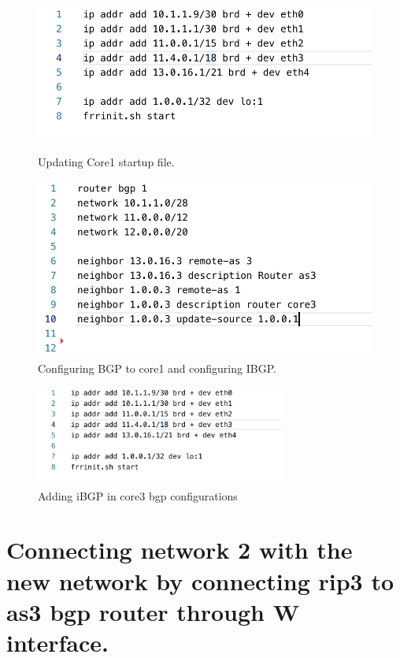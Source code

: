 \begin{figure}[H]
  \centering
  \begin{minipage}[b]{0.45\textwidth}
    \includegraphics[width=\textwidth]{Images/core1Update.png}
    \caption{Updating Core1 startup file.}
  \end{minipage}
  \hfill
  \begin{minipage}[b]{0.45\textwidth}
    \includegraphics[width=\textwidth]{Images/as3Core1.png}
    \caption{Configuring BGP to core1 and configuring IBGP.}
  \end{minipage}
\end{figure}

\begin{figure}[H]
\centering
  \includegraphics[width=0.73\textwidth]{Images/core1Update.png}
  \caption{Adding iBGP in core3 bgp configurations}
  \label{fig:2.10}
\end{figure}

\section{Connecting network 2 with the new network by connecting rip3 to as3 bgp router through W interface.}

